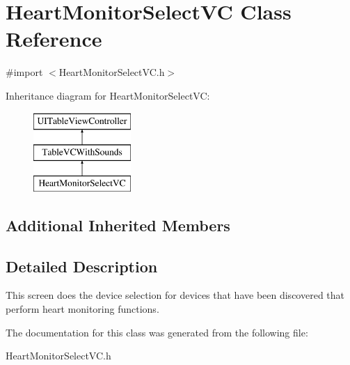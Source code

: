 \hypertarget{interface_heart_monitor_select_v_c}{\section{Heart\-Monitor\-Select\-V\-C Class Reference}
\label{interface_heart_monitor_select_v_c}
}


{\ttfamily \#import $<$Heart\-Monitor\-Select\-V\-C.\-h$>$}

Inheritance diagram for Heart\-Monitor\-Select\-V\-C\-:\begin{figure}[H]
\begin{center}
\leavevmode
\includegraphics[height=3.000000cm]{interface_heart_monitor_select_v_c}
\end{center}
\end{figure}
\subsection*{Additional Inherited Members}


\subsection{Detailed Description}
This screen does the device selection for devices that have been discovered that perform heart monitoring functions. 

The documentation for this class was generated from the following file\-:\begin{DoxyCompactItemize}
\item 
Heart\-Monitor\-Select\-V\-C.\-h\end{DoxyCompactItemize}
